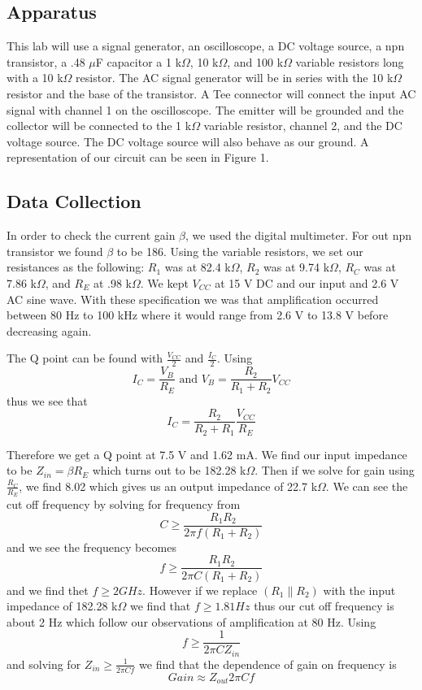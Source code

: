 \documentclass[11pt,letterpaper,onecolumn]{article}
\begin{document}
\subsection{Apparatus}

This lab will use a signal generator, an oscilloscope, a DC voltage source, a npn transistor, a .48 $\mu$F capacitor a 1 k$\Omega$, 10 k$\Omega$, and 100 k$\Omega$ variable resistors long with a 10 k$\Omega$ resistor. The AC signal generator will be in series with the 10 k$\Omega$ resistor and the base of the transistor. A Tee connector will connect the input AC signal with channel 1 on the oscilloscope. The emitter will be grounded and the collector will be connected to the 1 k$\Omega$ variable resistor, channel 2, and the DC voltage source. The DC voltage source will also behave as our ground. A representation of our circuit can be seen in Figure 1.  



\subsection{Data Collection}

In order to check the current gain $\beta$, we used the digital multimeter. For out npn transistor we found $\beta$ to be 186. Using the variable resistors, we set our resistances as the following: $R_1$ was at 82.4 k$\Omega$, $R_2$ was at 9.74 k$\Omega$, $R_C$ was at 7.86 k$\Omega$, and $R_E$ at .98 k$\Omega$. We kept $V_{CC}$ at 15 V DC and our input and 2.6 V AC sine wave. With these specification we was that amplification occurred between 80 Hz to 100 kHz where it would range from 2.6 V to 13.8 V before decreasing again. 

The Q point can be found with $\frac{V_{CC}}{2}$ and $\frac{I_C}{2}$. Using 
$$I_C = \frac{V_B}{R_E} \text{ and } V_B=\frac{R_2}{R_1 + R_2}V_{CC}$$
thus we see that 
$$I_C = \frac{R_2}{R_2+R_1}\frac{V_{CC}}{R_E}$$

Therefore we get a Q point at 7.5 V and 1.62 mA. We find our input impedance to be $Z_{in} = \beta R_E$ which turns out to be 182.28 k$\Omega$. Then if we solve for gain using $\frac{R_C}{R_E}$, we find 8.02 which gives us an output impedance of 22.7 k$\Omega$.
We can see the cut off frequency by solving for frequency from
$$C\ge\frac{R_1R_2}{2\pi f(R_1+R_2)}$$
and we see the frequency becomes 
$$f\ge\frac{R_1R_2}{2\pi C(R_1+R_2)}$$
and we find thet $f\ge 2GHz$. However if we replace $(R_1\parallel R_2)$ with the input impedance of 182.28 k$\Omega$ we find that $f\ge1.81Hz$ thus our cut off frequency is about 2 Hz which follow our observations of amplification at 80 Hz.
Using 
$$f\ge\frac{1}{2\pi CZ_{in}}$$
and solving for $Z_{in}\ge \frac{1}{2\pi Cf}$ we find that the dependence of gain on frequency is 
$$ Gain \approx Z_{out}2\pi Cf$$
\end{document}
